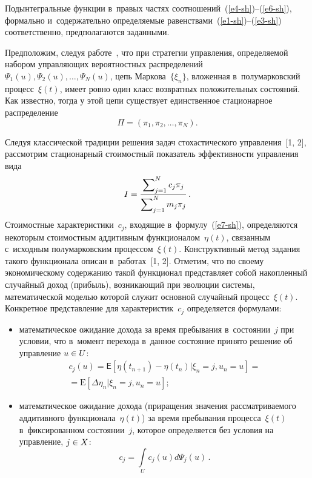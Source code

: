 \begin{multicols}{2}
Подынтегральные функции в~правых частях соотношений~(\ref{e4-sh})--(\ref{e6-sh}), формально 
и~содержательно определяемые равенствами~(\ref{e1-sh})--(\ref{e3-sh}) соответственно, предполагаются 
заданными.

Предположим, следуя работе~\cite{1}, что при стратегии управления, определяемой 
набором управляющих вероятностных распределений $ \Psi_{1}(u), 
\Psi_{2}(u),\ldots ,\Psi_{N}(u)$, цепь Маркова~$\{\xi_{n}\}$, вложенная 
в~полумарковский процесс~$\xi(t)$, имеет ровно один класс возвратных положительных 
состояний. Как известно, тогда у этой цепи существует единственное стационарное 
распределение 
$$
\Pi=\left(\pi_{1},\pi_{2},\ldots ,\pi_{N}\right).
$$

Следуя классической традиции решения задач стохастического управ\-ле\-ния~[1, 2], 
рассмотрим стационарный стоимостный показатель эф\-фек\-тив\-ности управ\-ле\-ния вида
\begin{equation}
I=\displaystyle\frac{\displaystyle \sum\nolimits_{j=1}^{N}c_j\pi_j\mathstrut}{\displaystyle \sum\nolimits_{j=1}^{N}m_j\pi_j\mathstrut}\,.
\label{e7-sh}
\end{equation}
Стоимостные характеристики~$c_j$, входящие в~формулу~(\ref{e7-sh}), определяются некоторым 
стоимостным аддитивным функционалом~$\eta(t)$, связанным с~исходным 
полумарковским процессом~$\xi(t)$. Конструктивный метод задания такого 
функционала описан в~работах~[1, 2]. Отметим, что по своему экономическому 
содержанию такой функционал пред\-став\-ля\-ет собой накопленный случайный доход 
(прибыль), возникающий при эволюции сис\-те\-мы, математической моделью которой 
служит основной случайный процесс~$\xi(t)$.
Конкретное представление для характеристик~$c_j$ определяется формулами:
\begin{itemize}
\item  математическое ожидание дохода за время 
пребывания в~состоянии~$j$ при условии, что в~момент перехода в~данное состояние 
принято решение об управ\-ле\-ние $u\hm\in{U}$:
\begin{multline*}
c_j(u)=\mathsf{E}\left[\eta(t_{n+1})-\eta(t_n)| \xi_n=j, u_n=u\right] ={}\\
{}=\mathrm{E} \left[\Delta\eta_n| \xi_n=j, u_n=u\right];
\end{multline*}
\item математическое ожидание дохода (приращения значения рассматриваемого 
аддитивного функционала~$\eta(t)$) за время пребывания процесса~$\xi(t)$ 
в~фиксированном состоянии~$j$, которое определяется без условия на управление, $j\hm\in X$:
\begin{equation*}
c_j=\int\limits_{U}c_j(u)d\Psi_j(u)\,.
\end{equation*}
\end{itemize}


\end{multicols}
